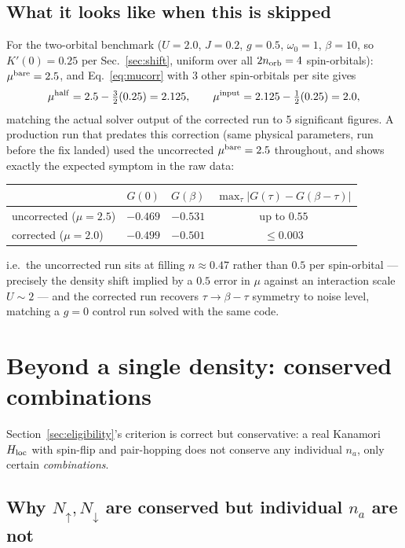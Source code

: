 \documentclass[a4paper,12pt]{article}
\renewcommand{\t}{\ensuremath{\tau}}
\newcommand{\w}{\ensuremath{\omega}}
\newcommand{\Hloc}{\ensuremath{H_{\rm loc}}}
\begin{document}
\subsection{What it looks like when this is skipped}

For the two-orbital benchmark ($U=2.0$, $J=0.2$, $g=0.5$, $\w_0=1$, $\beta=10$, so
$K'(0)=0.25$ per Sec.~\ref{sec:shift}, uniform over all $2n_{\rm orb}=4$
spin-orbitals): $\mu^{\rm bare}=2.5$, and Eq.~\eqref{eq:mucorr} with 3 other
spin-orbitals per site gives
\begin{equation}
  \mu^{\rm half} = 2.5 - \tfrac32(0.25) = 2.125, \qquad
  \mu^{\rm input} = 2.125 - \tfrac12(0.25) = 2.0,
\end{equation}
matching the actual solver output of the corrected run
to 5 significant figures. A production run that predates this correction (same
physical parameters, run before the fix landed) used the uncorrected
$\mu^{\rm bare}=2.5$ throughout, and shows exactly the expected symptom in the raw
data:
\begin{center}
\begin{tabular}{lccc}
  \toprule
  & $G(0)$ & $G(\beta)$ & $\max_\t|G(\t)-G(\beta-\t)|$ \\
  \midrule
  uncorrected ($\mu=2.5$) & $-0.469$ & $-0.531$ & up to $0.55$ \\
  corrected ($\mu=2.0$)   & $-0.499$ & $-0.501$ & $\le 0.003$ \\
  \bottomrule
\end{tabular}
\end{center}
i.e.\ the uncorrected run sits at filling $n\approx0.47$ rather than $0.5$ per
spin-orbital --- precisely the density shift implied by a $0.5$ error in $\mu$ against
an interaction scale $U\sim2$ --- and the corrected run recovers $\t\to\beta-\t$
symmetry to noise level, matching a $g=0$ control run solved with the same code.

\section{Beyond a single density: conserved combinations}
\label{sec:conserved}

Section~\ref{sec:eligibility}'s criterion is correct but conservative: a real Kanamori
$\Hloc$ with spin-flip and pair-hopping does not conserve any individual $n_a$, only
certain \emph{combinations}.

\subsection{Why $N_\uparrow,N_\downarrow$ are conserved but individual $n_a$ are not}
\label{sec:kanamori-check}
\end{document}
